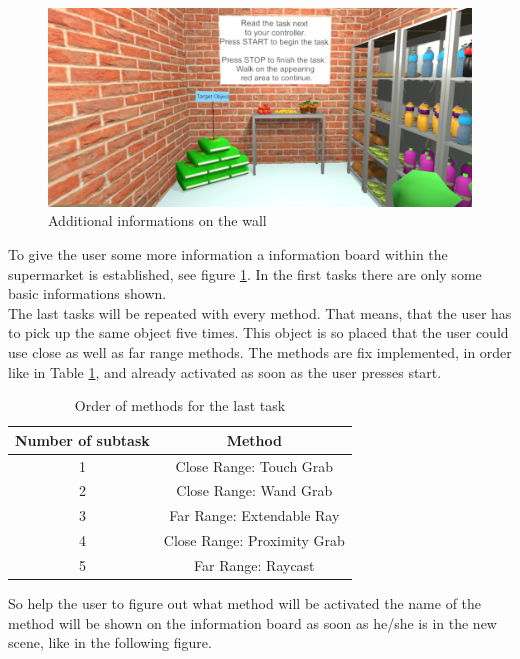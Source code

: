 \begin{figure}[H] 
	\center 
	\includegraphics[width=12cm]{Images/TaskWall_1.PNG}
	\caption[Additional informations on the wall]{Additional informations on the wall}
	\label{fig:taskW1}
\end{figure}

To give the user some more information a information board within the supermarket is established, see figure \ref{fig:taskW1}. In the first tasks there are only some basic informations shown.\\
The last tasks will be repeated with every method. That means, that the user has to pick up the same object five times. This object is so placed that the user could use close as well as far range methods. The methods are fix implemented, in order like in Table \ref{tab: OrderMethods}, and already activated as soon as the user presses start. \\

\begin{table}[h]
\centering
 \begin{tabular}{|c|c|}
  Number of subtask & Method  \\ \hline
  1 & Close Range: Touch Grab  \\
  2 & Close Range: Wand Grab  \\
  3 & Far Range: Extendable Ray  \\
  4 & Close Range: Proximity Grab  \\
  5 & Far Range: Raycast \\
   \end{tabular}
  \caption[Order of methods for the last task]{Order of methods for the last task}
	\label{tab: OrderMethods}
 \end{table}

So help the user to figure out what method will be activated the name of the method will be shown on the information board as soon as  he/she is in the new scene, like in the following figure. 

